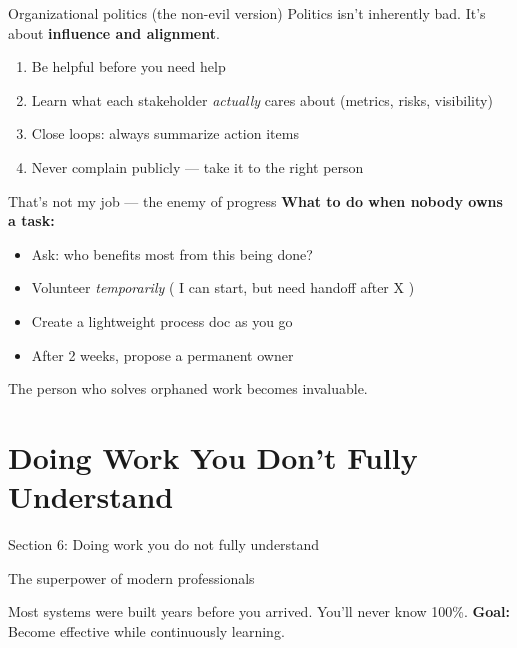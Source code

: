 \documentclass[aspectratio=169, 11pt]{beamer}
\begin{document}
	\begin{frame}{Organizational politics (the non-evil version)}
		Politics isn't inherently bad. It's about \textbf{influence and alignment}.
		\begin{enumerate}
			\item Be helpful before you need help
			\item Learn what each stakeholder \textit{actually} cares about (metrics, risks, visibility)
			\item Close loops: always summarize action items
			\item Never complain publicly — take it to the right person
		\end{enumerate}
	\end{frame}
	
	\begin{frame}{  That's not my job  — the enemy of progress}
		\textbf{What to do when nobody owns a task:}
		\begin{itemize}
			\item Ask: who benefits most from this being done?
			\item Volunteer \textit{temporarily} (  I can start, but need handoff after X )
			\item Create a lightweight process doc as you go
			\item After 2 weeks, propose a permanent owner
		\end{itemize}
		\alert{The person who solves orphaned work becomes invaluable.}
	\end{frame}
	
	\section{Doing Work You Don't Fully Understand}
	\begin{frame}{Section 6: Doing work you do not fully understand}
		\begin{center}
			\Large{The superpower of modern professionals}
		\end{center}
		\vspace{0.3cm}
		Most systems were built years before you arrived. You'll never know 100\%.
		\vspace{0.3cm}
		\textbf{Goal:} Become effective while continuously learning.
	\end{frame}
	
\end{document}
